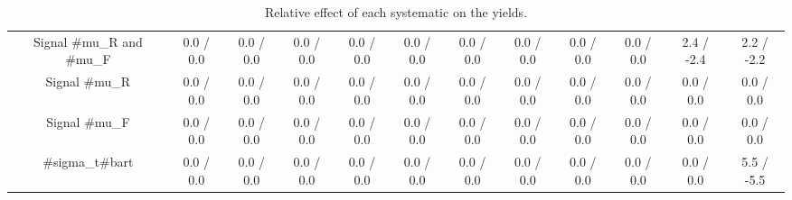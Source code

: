 \begin{table}[htbp]
\begin{center}
\begin{tabular}{|c|c|c|c|c|c|c|c|c|c|c|c|}
  Signal #mu_{R} and #mu_{F} & 0.0 / 0.0 & 0.0 / 0.0 & 0.0 / 0.0 & 0.0 / 0.0 & 0.0 / 0.0 & 0.0 / 0.0 & 0.0 / 0.0 & 0.0 / 0.0 & 0.0 / 0.0 & 2.4 / -2.4 & 2.2 / -2.2 \\ 
  Signal #mu_{R} & 0.0 / 0.0 & 0.0 / 0.0 & 0.0 / 0.0 & 0.0 / 0.0 & 0.0 / 0.0 & 0.0 / 0.0 & 0.0 / 0.0 & 0.0 / 0.0 & 0.0 / 0.0 & 0.0 / 0.0 & 0.0 / 0.0 \\ 
  Signal #mu_{F} & 0.0 / 0.0 & 0.0 / 0.0 & 0.0 / 0.0 & 0.0 / 0.0 & 0.0 / 0.0 & 0.0 / 0.0 & 0.0 / 0.0 & 0.0 / 0.0 & 0.0 / 0.0 & 0.0 / 0.0 & 0.0 / 0.0 \\ 
  #sigma_{t#bar{t}} & 0.0 / 0.0 & 0.0 / 0.0 & 0.0 / 0.0 & 0.0 / 0.0 & 0.0 / 0.0 & 0.0 / 0.0 & 0.0 / 0.0 & 0.0 / 0.0 & 0.0 / 0.0 & 0.0 / 0.0 & 5.5 / -5.5 \\ 
\hline 
\end{tabular} 
\caption{Relative effect of each systematic on the yields.} 
\end{center} 
\end{table} 
